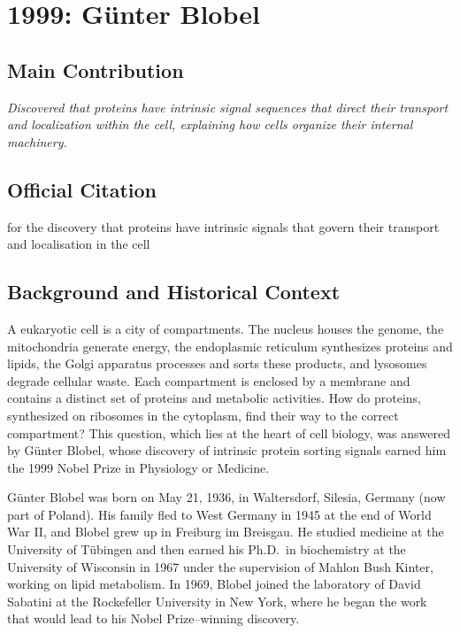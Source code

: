 \chapter[1999 --- Blobel]{1999: G\"unter Blobel}
\label{ch:1999_Blobel}

\section*{Main Contribution}

\textit{Discovered that proteins have intrinsic signal sequences that direct their transport and localization within the cell, explaining how cells organize their internal machinery.}\cite{nobel-1999,lecture-1999}

\section{Official Citation}

for the discovery that proteins have intrinsic signals that govern their transport and localisation in the cell

\section{Background and Historical Context}

A eukaryotic cell is a city of compartments. The nucleus houses the genome, the mitochondria generate energy, the endoplasmic reticulum synthesizes proteins and lipids, the Golgi apparatus processes and sorts these products, and lysosomes degrade cellular waste. Each compartment is enclosed by a membrane and contains a distinct set of proteins and metabolic activities. How do proteins, synthesized on ribosomes in the cytoplasm, find their way to the correct compartment? This question, which lies at the heart of cell biology, was answered by G\"unter Blobel, whose discovery of intrinsic protein sorting signals earned him the 1999 Nobel Prize in Physiology or Medicine.

G\"unter Blobel was born on May 21, 1936, in Waltersdorf, Silesia, Germany (now part of Poland). His family fled to West Germany in 1945 at the end of World War II, and Blobel grew up in Freiburg im Breisgau. He studied medicine at the University of T{\"u}bingen and then earned his Ph.D.\ in biochemistry at the University of Wisconsin in 1967 under the supervision of Mahlon Bush Kinter, working on lipid metabolism. In 1969, Blobel joined the laboratory of David Sabatini at the Rockefeller University in New York, where he began the work that would lead to his Nobel Prize--winning discovery.

